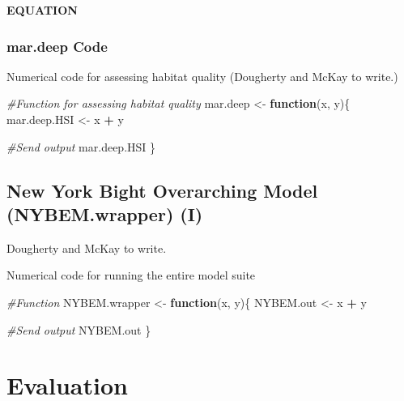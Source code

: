 \documentclass[
]{book}
\newenvironment{Shaded}{\begin{snugshade}}{\end{snugshade}}
\newcommand{\CommentTok}[1]{\textcolor[rgb]{0.56,0.35,0.01}{\textit{#1}}}
\newcommand{\ControlFlowTok}[1]{\textcolor[rgb]{0.13,0.29,0.53}{\textbf{#1}}}
\newcommand{\NormalTok}[1]{#1}
\newcommand{\OperatorTok}[1]{\textcolor[rgb]{0.81,0.36,0.00}{\textbf{#1}}}
\newcommand{\StringTok}[1]{\textcolor[rgb]{0.31,0.60,0.02}{#1}}
\begin{document}
\textbf{EQUATION}

\hypertarget{mar.deep-code}{%
\subsection{mar.deep Code}\label{mar.deep-code}}

Numerical code for assessing habitat quality ({Dougherty and McKay to write.})

\begin{Shaded}
\begin{Highlighting}[]
\CommentTok{#Function for assessing habitat quality}
\NormalTok{mar.deep <-}\StringTok{ }\ControlFlowTok{function}\NormalTok{(x, y)\{}
\NormalTok{  mar.deep.HSI <-}\StringTok{ }\NormalTok{x }\OperatorTok{+}\StringTok{ }\NormalTok{y}

  \CommentTok{#Send output}
\NormalTok{  mar.deep.HSI}
\NormalTok{\}}
\end{Highlighting}
\end{Shaded}

\hypertarget{new-york-bight-overarching-model-nybem.wrapper-i}{%
\section{New York Bight Overarching Model (NYBEM.wrapper) (I)}\label{new-york-bight-overarching-model-nybem.wrapper-i}}

{Dougherty and McKay to write.}

Numerical code for running the entire model suite

\begin{Shaded}
\begin{Highlighting}[]
\CommentTok{#Function }
\NormalTok{NYBEM.wrapper <-}\StringTok{ }\ControlFlowTok{function}\NormalTok{(x, y)\{}
\NormalTok{  NYBEM.out <-}\StringTok{ }\NormalTok{x }\OperatorTok{+}\StringTok{ }\NormalTok{y}

  \CommentTok{#Send output}
\NormalTok{  NYBEM.out}
\NormalTok{\}}
\end{Highlighting}
\end{Shaded}

\hypertarget{evaluation}{%
\chapter{Evaluation}\label{evaluation}}
\end{document}
